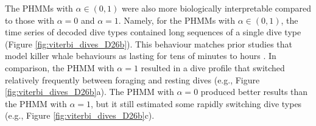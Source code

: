 The PHMMs with $\alpha \in (0,1)$ were also more biologically interpretable compared to those with $\alpha = 0$ and $\alpha = 1$. Namely, for the PHMMs with $\alpha \in (0,1)$, the time series of decoded dive types contained long sequences of a single dive type (Figure \ref{fig:viterbi_dives_D26b}). This behaviour matches prior studies that model killer whale behaviours as lasting for tens of minutes to hours \citep{McRae:2024}. In comparison, the PHMM with $\alpha = 1$ resulted in a dive profile that switched relatively frequently between foraging and resting dives (e.g., Figure \ref{fig:viterbi_dives_D26b}a). The PHMM with $\alpha = 0$ produced better results than the PHMM with $\alpha = 1$, but it still estimated some rapidly switching dive types (e.g., Figure \ref{fig:viterbi_dives_D26b}c).



